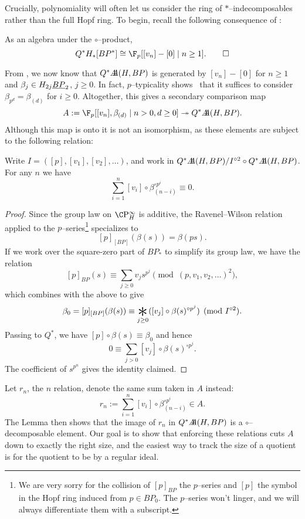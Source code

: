 Crucially, polynomiality will often let us consider the ring of $\ast$--indecomposables rather than the full Hopf ring.  To begin, recall the following consequence of :

\begin{corollary}
As an algebra under the $\circ$--product, \[Q^* H_*[BP^*] \cong \F_p[[v_n] - [0] \mid n \ge 1]. \qed\]
\end{corollary}

\noindent From , we now know that $Q^* \AA(H, BP)$ is generated by $[v_n] - [0]$ for $n \ge 1$ and $\beta_j \in H_{2j} \OS{BP}{2}$, $j \ge 0$.  In fact, $p$--typicality shows~\cite[Lemma 4.14]{RavenelWilsonHopfRingForMU} that it suffices to consider $\beta_{p^d} = \beta_{(d)}$ for $i \ge 0$.  Altogether, this gives a secondary comparison map \[A := \F_p[[v_n], \beta_{(d)} \mid n > 0, d \ge 0] \onto Q^* \AA(H, BP).\]  Although this map is onto it is not an isomorphism, as these elements are subject to the following relation:

\begin{lemma}
Write $I = ([p], [v_1], [v_2], \ldots)$, and work in $Q^* \AA(H, BP) / I^{\circ 2} \circ Q^* \AA(H, BP)$.  For any $n$ we have \[\sum_{i=1}^n [v_i] \circ \beta_{(n-i)}^{\circ p^i} \equiv 0.\]
\end{lemma}
\begin{proof}
Since the group law on $\CP^\infty_H$ is additive, the Ravenel--Wilson relation applied to the $p$--series\footnote{We are very sorry for the collision of $[p]_{BP}$ the $p$--series and $[p]$ the symbol in the Hopf ring induced from $p \in BP_0$.  The $p$--series won't linger, and we will always differentiate them with a subscript.} specializes to \[[p]_{[BP]}(\beta(s)) = \beta(ps).\]  If we work over the square-zero part of $BP_*$ to simplify its group law, we have the relation \[[p]_{BP}(s) \equiv \sum_{j \ge 0} v_j s^{p^j} \pmod{(p, v_1, v_2, \ldots)^2},\] which combines with the above to give \[\beta_0 = [p]_{[BP]}(\beta(s)) \equiv \bigast_{j \ge 0} ([v_j] \circ \beta(s)^{\circ p^j}) \pmod{I^{\circ 2}}.\]  Passing to $Q^*$, we have $[p] \circ \beta(s) \equiv \beta_0$ and hence \[0 \equiv \sum_{j > 0} [v_j] \circ \beta(s)^{\circ p^j}.\]  The coefficient of $s^{p^n}$ gives the identity claimed.
\end{proof}

Let $r_n$, the $n${\th} relation, denote the same sum taken in $A$ instead: \[r_n := \sum_{i=1}^n [v_i] \circ \beta_{(n-i)}^{\circ p^i} \in A.\]  The Lemma then shows that the image of $r_n$ in $Q^* \AA(H, BP)$ is a $\circ$--decomposable element.  Our goal is to show that enforcing these relations cuts $A$ down to exactly the right size, and the easiest way to track the size of a quotient is for the quotient to be by a regular ideal.

